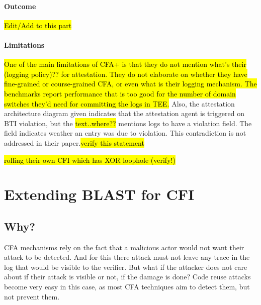 \documentclass[a4paper, nobind]{templates/ociamthesis}
\begin{document}
\subsubsection{Outcome}\label{outcome-1}

\hl{Edit/Add to this part}

\subsubsection{Limitations}\label{limitations-1}

\hl{One of the main limitations of CFA+ is that they do not mention what's their
(logging policy)?? for attestation. They do not elaborate on whether they have
fine-grained or course-grained CFA, or even what is their logging mechanism.
The benchmarks report performance that is too good for the number of domain
switches they'd need for committing the logs in TEE.}
Also, the attestation architecture diagram given indicates that the attestation
agent is triggered on BTI violation, but the \hl{text..where??}
mentions logs to have a violation field. The field indicates weather an entry was due to violation.
This contradiction is not addressed in their paper.\hl{verify this statement}

\hl{rolling their own CFI which has XOR loophole (verify!)}

\chapter{Extending BLAST for CFI}\label{extending-blast-for-cfi}

\minitoc 

\section{Why?}\label{why-1}

CFA mechanisms rely on the fact that a malicious actor would not want their attack
to be detected. And for this there attack must not leave any trace in the log that
would be visible to the verifier. But what if the attacker does not care about if
their attack is visible or not, if the damage is done? Code reuse attacks become
very easy in this case, as most CFA techniques aim to detect them, but not prevent them.
\end{document}
